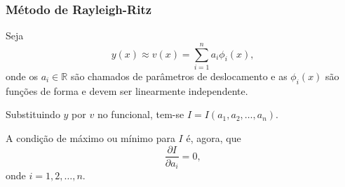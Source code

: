 \documentclass{beamer}
\newif\ifcompilepause
\newcommand{\cpause}{
	\ifcompilepause
	\pause
	\fi
}
\begin{document}
	\begin{frame}
		\frametitle{Método de Rayleigh-Ritz}
		\justify
		
		Seja
		$$
			y(x) \approx v(x)=\sum_{i=1}^n a_i \phi_i(x)
			\text{,}
		$$
		onde os $a_i\in\mathbb{R}$ são chamados de parâmetros de deslocamento e as $\phi_i(x)$ são funções de forma e devem ser linearmente independente.
		\vspace{10pt}
		\cpause
		
		Substituindo $y$ por $v$ no funcional, tem-se $I=I(a_1, a_2, \dots, a_n)$.
		\vspace{10pt}
		\cpause
		
		A condição de máximo ou mínimo para $I$ é, agora, que
		$$
			\frac{\partial I}{\partial a_i} = 0
			\text{,}
		$$
		onde $i=1,2,\dots,n$.
	\end{frame}
	
\end{document}
